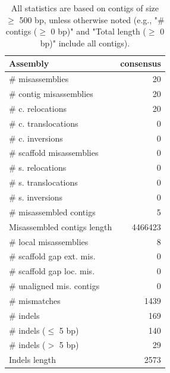 \documentclass[12pt,a4paper]{article}
\begin{document}
\begin{table}[ht]
\begin{center}
\caption{All statistics are based on contigs of size $\geq$ 500 bp, unless otherwise noted (e.g., "\# contigs ($\geq$ 0 bp)" and "Total length ($\geq$ 0 bp)" include all contigs).}
\begin{tabular}{|l*{1}{|r}|}
\hline
Assembly & consensus \\ \hline
\# misassemblies & 20 \\ \hline
\hspace{2mm}\# contig misassemblies & 20 \\ \hline
\hspace{5mm}\# c. relocations & 20 \\ \hline
\hspace{5mm}\# c. translocations & 0 \\ \hline
\hspace{5mm}\# c. inversions & 0 \\ \hline
\hspace{2mm}\# scaffold misassemblies & 0 \\ \hline
\hspace{5mm}\# s. relocations & 0 \\ \hline
\hspace{5mm}\# s. translocations & 0 \\ \hline
\hspace{5mm}\# s. inversions & 0 \\ \hline
\# misassembled contigs & 5 \\ \hline
Misassembled contigs length & 4466423 \\ \hline
\# local misassemblies & 8 \\ \hline
\# scaffold gap ext. mis. & 0 \\ \hline
\# scaffold gap loc. mis. & 0 \\ \hline
\# unaligned mis. contigs & 0 \\ \hline
\# mismatches & 1439 \\ \hline
\# indels & 169 \\ \hline
\hspace{5mm}\# indels ($\leq$ 5 bp) & 140 \\ \hline
\hspace{5mm}\# indels ($>$ 5 bp) & 29 \\ \hline
Indels length & 2573 \\ \hline
\end{tabular}
\end{center}
\end{table}
\end{document}
